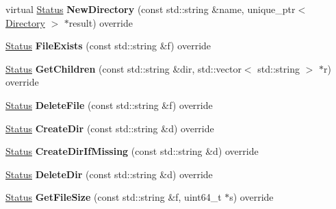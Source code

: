 \begin{DoxyCompactItemize}
\item 
virtual \hyperlink{classrocksdb_1_1Status}{Status} {\bfseries New\+Directory} (const std\+::string \&name, unique\+\_\+ptr$<$ \hyperlink{classrocksdb_1_1Directory}{Directory} $>$ $\ast$result) override\hypertarget{classrocksdb_1_1EnvMirror_ae325e2b590476a6bfbaaece47fbd007f}{}\label{classrocksdb_1_1EnvMirror_ae325e2b590476a6bfbaaece47fbd007f}

\item 
\hyperlink{classrocksdb_1_1Status}{Status} {\bfseries File\+Exists} (const std\+::string \&f) override\hypertarget{classrocksdb_1_1EnvMirror_aa678cb923cf3ce0ed7d63eed05e80a03}{}\label{classrocksdb_1_1EnvMirror_aa678cb923cf3ce0ed7d63eed05e80a03}

\item 
\hyperlink{classrocksdb_1_1Status}{Status} {\bfseries Get\+Children} (const std\+::string \&dir, std\+::vector$<$ std\+::string $>$ $\ast$r) override\hypertarget{classrocksdb_1_1EnvMirror_a1960df889f22e8a291685be525ce3a44}{}\label{classrocksdb_1_1EnvMirror_a1960df889f22e8a291685be525ce3a44}

\item 
\hyperlink{classrocksdb_1_1Status}{Status} {\bfseries Delete\+File} (const std\+::string \&f) override\hypertarget{classrocksdb_1_1EnvMirror_a24cc55f67dc4a8d709c7f8051a1798a2}{}\label{classrocksdb_1_1EnvMirror_a24cc55f67dc4a8d709c7f8051a1798a2}

\item 
\hyperlink{classrocksdb_1_1Status}{Status} {\bfseries Create\+Dir} (const std\+::string \&d) override\hypertarget{classrocksdb_1_1EnvMirror_aa22907e532ba18d3ab38fcadc40e52d2}{}\label{classrocksdb_1_1EnvMirror_aa22907e532ba18d3ab38fcadc40e52d2}

\item 
\hyperlink{classrocksdb_1_1Status}{Status} {\bfseries Create\+Dir\+If\+Missing} (const std\+::string \&d) override\hypertarget{classrocksdb_1_1EnvMirror_a47ffc0e4f721f3160abf26f2dd9d7017}{}\label{classrocksdb_1_1EnvMirror_a47ffc0e4f721f3160abf26f2dd9d7017}

\item 
\hyperlink{classrocksdb_1_1Status}{Status} {\bfseries Delete\+Dir} (const std\+::string \&d) override\hypertarget{classrocksdb_1_1EnvMirror_a40f31f2af0a4540241910e14734447cc}{}\label{classrocksdb_1_1EnvMirror_a40f31f2af0a4540241910e14734447cc}

\item 
\hyperlink{classrocksdb_1_1Status}{Status} {\bfseries Get\+File\+Size} (const std\+::string \&f, uint64\+\_\+t $\ast$s) override\hypertarget{classrocksdb_1_1EnvMirror_a25359fd3c7f4a5ca01c9690ca2e0e534}{}\label{classrocksdb_1_1EnvMirror_a25359fd3c7f4a5ca01c9690ca2e0e534}


\end{DoxyCompactItemize}
